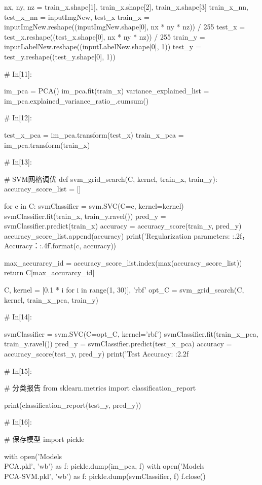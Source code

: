 \documentclass{MathorCupmodeling}
\begin{document}
\begin{python}
nx, ny, nz = train_x.shape[1], train_x.shape[2], train_x.shape[3]
train_x_nn, test_x_nn = inputImgNew, test_x
train_x = inputImgNew.reshape((inputImgNew.shape[0], nx * ny * nz)) / 255
test_x = test_x.reshape((test_x.shape[0], nx * ny * nz)) / 255
train_y = inputLabelNew.reshape((inputLabelNew.shape[0], 1))
test_y = test_y.reshape((test_y.shape[0], 1))

# In[11]:


im_pca = PCA()
im_pca.fit(train_x)
variance_explained_list = im_pca.explained_variance_ratio_.cumsum()

# In[12]:


test_x_pca = im_pca.transform(test_x)
train_x_pca = im_pca.transform(train_x)


# In[13]:


# SVM网格调优
def svm_grid_search(C, kernel, train_x, train_y):
    accuracy_score_list = []

    for c in C:
        svmClassifier = svm.SVC(C=c, kernel=kernel)
        svmClassifier.fit(train_x, train_y.ravel())
        pred_y = svmClassifier.predict(train_x)
        accuracy = accuracy_score(train_y, pred_y)
        accuracy_score_list.append(accuracy)
        print('Regularization parameters: {:.2f}，Accuracy：{:.4f}'.format(c, accuracy))

    max_accurarcy_id = accuracy_score_list.index(max(accuracy_score_list))
    return C[max_accurarcy_id]


C, kernel = [0.1 * i for i in range(1, 30)], 'rbf'
opt_C = svm_grid_search(C, kernel, train_x_pca, train_y)

# In[14]:


svmClassifier = svm.SVC(C=opt_C, kernel='rbf')
svmClassifier.fit(train_x_pca, train_y.ravel())
pred_y = svmClassifier.predict(test_x_pca)
accuracy = accuracy_score(test_y, pred_y)
print('Test Accuracy: {:2.2f}%

# In[15]:


# 分类报告
from sklearn.metrics import classification_report

print(classification_report(test_y, pred_y))

# In[16]:


# 保存模型
import pickle

with open('Models\\PCA.pkl', 'wb') as f:
    pickle.dump(im_pca, f)
with open('Models\\PCA-SVM.pkl', 'wb') as f:
    pickle.dump(svmClassifier, f)
f.close()

\end{python}
\end{document}
